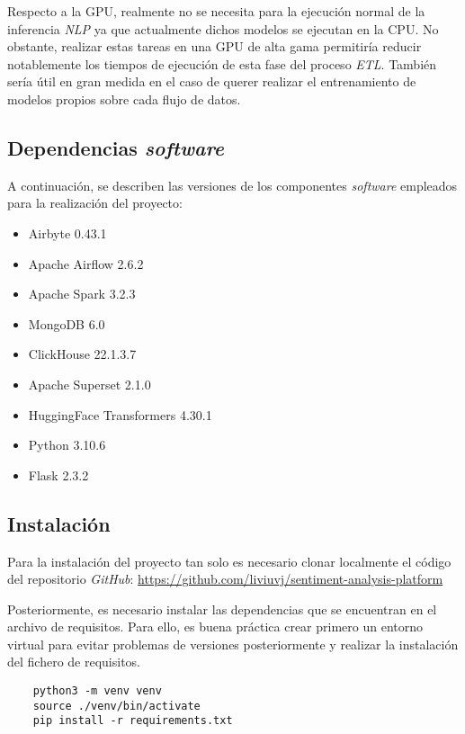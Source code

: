 Respecto a la GPU, realmente no se necesita para la ejecución normal de la inferencia \textit{NLP} ya que actualmente dichos modelos se ejecutan en la CPU. No obstante, realizar estas tareas en una GPU de alta gama permitiría reducir notablemente los tiempos de ejecución de esta fase del proceso \textit{ETL}. También sería útil en gran medida en el caso de querer realizar el entrenamiento de modelos propios sobre cada flujo de datos.

\subsection{Dependencias \textit{software}}

A continuación, se describen las versiones de los componentes \textit{software} empleados para la realización del proyecto:

\begin{itemize}
    \item Airbyte 0.43.1
    \item Apache Airflow 2.6.2
    \item Apache Spark 3.2.3
    \item MongoDB 6.0
    \item ClickHouse 22.1.3.7
    \item Apache Superset 2.1.0
    \item HuggingFace Transformers 4.30.1
    \item Python 3.10.6
    \item Flask 2.3.2
\end{itemize}

\subsection{Instalación}

Para la instalación del proyecto tan solo es necesario clonar localmente el código del repositorio \textit{GitHub}: \url{https://github.com/liviuvj/sentiment-analysis-platform}

Posteriormente, es necesario instalar las dependencias que se encuentran en el archivo de requisitos. Para ello, es buena práctica crear primero un entorno virtual para evitar problemas de versiones posteriormente y realizar la instalación del fichero de requisitos.

\begin{verbatim}
    python3 -m venv venv
    source ./venv/bin/activate
    pip install -r requirements.txt
\end{verbatim}


